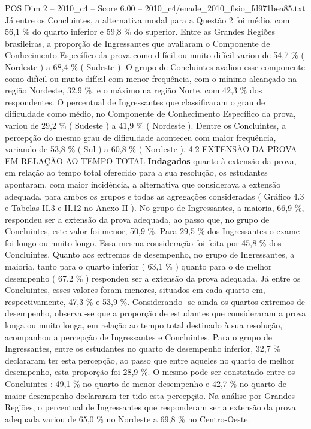 \begin{textsample}{POS Dim 2 – 2010\_c4 – Score 6.00 – 2010\_c4/enade\_2010\_fisio\_fd971bea85.txt}
Já entre os Concluintes, a alternativa modal para a Questão 2 foi médio, com 56,1 \% do quarto inferior e 59,8 \% do superior.
Entre as Grandes Regiões brasileiras, a proporção de Ingressantes que avaliaram o Componente de Conhecimento Específico da prova como difícil ou muito difícil variou de 54,7 \% ( Nordeste ) a 68,4 \% ( Sudeste ).
O grupo de Concluintes avaliou esse componente como difícil ou muito difícil com menor frequência, com o mínimo alcançado na região Nordeste, 32,9 \%, e o máximo na região Norte, com 42,3 \% dos respondentes.
O percentual de Ingressantes que classificaram o grau de dificuldade como médio, no Componente de Conhecimento Específico da prova, variou de 29,2 \% ( Sudeste ) a 41,9 \% ( Nordeste ).
Dentre os Concluintes, a percepção do mesmo grau de dificuldade aconteceu com maior frequência, variando de 53,8 \% ( Sul ) a 60,8 \% ( Nordeste ). 4.2 EXTENSÃO DA PROVA EM RELAÇÃO AO TEMPO TOTAL \textbf{Indagados} quanto à extensão da prova, em relação ao tempo total oferecido para a sua resolução, os estudantes apontaram, com maior incidência, a alternativa que considerava a extensão adequada, para ambos os grupos e todas as agregações consideradas ( Gráfico 4.3 e Tabelas II.3 e II.12 no Anexo II ).
No grupo de Ingressantes, a maioria, 66,9 \%, respondeu ser a extensão da prova adequada, ao passo que, no grupo de Concluintes, este valor foi menor, 50,9 \%.
Para 29,5 \% dos Ingressantes o exame foi longo ou muito longo.
Essa mesma consideração foi feita por 45,8 \% dos Concluintes.
Quanto aos extremos de desempenho, no grupo de Ingressantes, a maioria, tanto para o quarto inferior ( 63,1 \% ) quanto para o de melhor desempenho ( 67,2 \% ) respondeu ser a extensão da prova adequada.
Já entre os Concluintes, esses valores foram menores, situados em cada quarto em, respectivamente, 47,3 \% e 53,9 \%.
Considerando -se ainda os quartos extremos de desempenho, observa -se que a proporção de estudantes que consideraram a prova longa ou muito longa, em relação ao tempo total destinado à sua resolução, acompanhou a percepção de Ingressantes e Concluintes.
Para o grupo de Ingressantes, entre os estudantes no quarto de desempenho inferior, 32,7 \% declararam ter esta percepção, ao passo que entre aqueles no quarto de melhor desempenho, esta proporção foi 28,9 \%.
O mesmo pode ser constatado entre os Concluintes : 49,1 \% no quarto de menor desempenho e 42,7 \% no quarto de maior desempenho declararam ter tido esta percepção.
Na análise por Grandes Regiões, o percentual de Ingressantes que responderam ser a extensão da prova adequada variou de 65,0 \% no Nordeste a 69,8 \% no Centro-Oeste.

\end{textsample}
